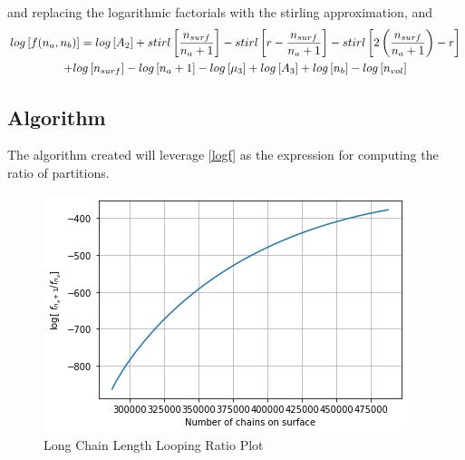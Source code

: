 \documentclass[10pt,letterpaper]{article}
\newcommand{\AlgoFuncMult}{
	\ensuremath{
		log
		\left[
		A_2
		\right]
		+
		stirl\left[
		\frac{
			n_{surf}
		}{
			n_a+1				
		}
		\right]
		-
		stirl\left[
		r-
		\frac{
			n_{surf}
		}{
			n_a+1				
		}
		\right]
		-
		stirl\left[
		2
		\left(
		\frac{
			n_{surf}
		}{
			n_a+1				
		}
		\right)	
		-
		r
		\right]\\
		+
		log
		\left[
		n_{surf}
		\right]
		-
		log
		\left[
		n_a+1
		\right]
		-
		log
		\left[
		\mu_{3}
		\right]
		+
		log
		\left[
		A_3
		\right]
		+
		log
		\left[
		n_{b}
		\right]
		-
		log
		\left[
		n_{vol}	
		\right]
	}
}
\begin{document}
\noindent and replacing the logarithmic factorials with the stirling approximation, and 
%
%
%
\begin{multline}
	log
	\left[
	f(n_a,n_b)
	\right]
	=
	\AlgoFuncMult
	\label{logf}
\end{multline}

\newpage
\subsection{Algorithm}

The algorithm created will leverage \ref{logf} as the expression for computing the ratio of partitions.

\begin{figure}[h!]
	\centering
	\includegraphics[scale=0.85]{plotFigure_2.png}
	\caption{Long Chain Length Looping Ratio Plot}
	\label{Long}
\end{figure}
\end{document}
